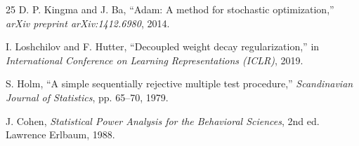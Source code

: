 \documentclass[conference]{IEEEtran}
\begin{document}
\begin{thebibliography}{25}
 D. P. Kingma and J. Ba, ``Adam: A method for stochastic optimization,'' \textit{arXiv preprint arXiv:1412.6980}, 2014.

 I. Loshchilov and F. Hutter, ``Decoupled weight decay regularization,'' in \textit{International Conference on Learning Representations (ICLR)}, 2019.

 S. Holm, ``A simple sequentially rejective multiple test procedure,'' \textit{Scandinavian Journal of Statistics}, pp. 65--70, 1979.

 J. Cohen, \textit{Statistical Power Analysis for the Behavioral Sciences}, 2nd ed. Lawrence Erlbaum, 1988.

\end{thebibliography}
\end{document}
